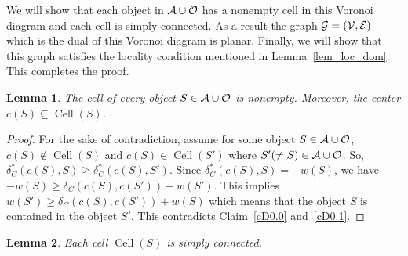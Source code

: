 \documentclass[a4paper,11pt]{article}
\DeclareMathOperator{\Cell}{Cell}
\newtheorem{lemma}{Lemma}
\begin{document}
 We will show that each object in ${\cal A}\cup {\cal O}$ has a nonempty cell in this Voronoi diagram and each cell is simply connected. As a result the graph  ${\cal G}=({\cal V},{\cal E})$ which  is the dual of this Voronoi diagram is planar. Finally, we will show that this graph satisfies the locality condition mentioned in Lemma~\ref{lem_loc_dom}. This completes the proof.

\begin{lemma}\label{Al1}
 The cell of every object ${S}\in {\cal A}\cup 
{\cal O}$ is nonempty. 
Moreover, 
 the center $c({S}) \subseteq  
\Cell({S})$. 
\end{lemma}
\begin{proof}
For the sake of contradiction, assume for some object $S\in{\cal A}\cup {\cal O}$, $c(S)\notin \Cell(S)$ and $c(S)\in \Cell(S')$ where $S'(\neq S)\in {\cal A}\cup {\cal O}$. So, $\delta_{C}^{*}(c(S),S)\geq \delta_{C}^{*}(c(S),S')$. Since $\delta_{C}^{*}(c(S),S)=-w(S)$, we have $-w(S)\geq \delta_{C}(c(S),c(S'))-w(S')$. This implies $w(S')\geq\delta_{C}(c(S),c(S')) +w(S)$ which means that the object $S$ is contained in the object $S'$. This contradicts Claim~\ref{cD0.0} and~\ref{cD0.1}. 
\end{proof}

 
 \begin{lemma}\label{Al2}
 Each cell  $\Cell({S})$  is simply connected.
 \end{lemma}
\end{document}
